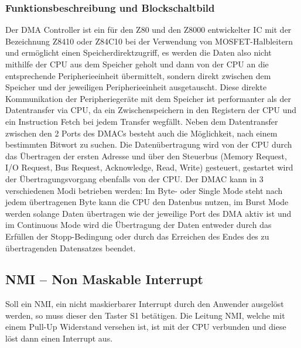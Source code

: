 \subsubsection{Funktionsbeschreibung und Blockschaltbild}
Der DMA Controller ist ein für den Z80 und den Z8000 entwickelter IC mit der Bezeichnung Z8410 oder Z84C10 bei der Verwendung von MOSFET-Halbleitern und ermöglicht einen Speicherdirektzugriff, es werden die Daten also nicht mithilfe der CPU aus dem Speicher geholt und dann von der CPU an die entsprechende Peripherieeinheit übermittelt, sondern direkt zwischen dem Speicher und der jeweiligen Peripherieeinheit ausgetauscht. Diese direkte Kommunikation der Peripheriegeräte mit dem Speicher ist performanter als der Datentransfer via CPU, da ein Zwischenspeichern in den Registern der CPU und ein Instruction Fetch bei jedem Transfer wegfällt. Neben dem Datentransfer zwischen den 2 Ports des DMACs besteht auch die Möglichkeit, nach einem bestimmten Bitwort zu suchen. Die Datenübertragung wird von der CPU durch das Übertragen der ersten Adresse und über den Steuerbus (Memory Request, I/O Request, Bus Request, Acknowledge, Read, Write) gesteuert, gestartet wird der Übertragungsvorgang ebenfalls von der CPU. Der DMAC kann in 3 verschiedenen Modi betrieben werden: Im Byte- oder Single Mode steht nach jedem übertragenen Byte kann die CPU den Datenbus nutzen, im Burst Mode werden solange Daten übertragen wie der jeweilige Port des DMA aktiv ist und im Continuous Mode wird die Übertragung der Daten entweder durch das Erfüllen der Stopp-Bedingung oder durch das Erreichen des Endes des zu übertragenden Datensatzes beendet.

\subsection{NMI -- Non Maskable Interrupt}
Soll ein NMI, ein nicht maskierbarer Interrupt durch den Anwender ausgelöst werden, so muss dieser den Taster S1 betätigen. Die Leitung NMI, welche mit einem Pull-Up Widerstand versehen ist, ist mit der CPU verbunden und diese löst dann einen Interrupt aus.

